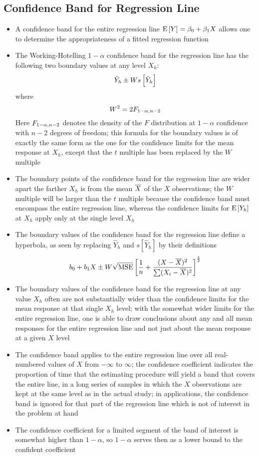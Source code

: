 \subsection{Confidence Band for Regression Line}
\begin{itemize}
\item A confidence band for the entire regression line $\mathrm{E}\left[ Y \right] = \beta_0 + \beta_1X$ allows one to determine the appropriateness of a fitted regression function
\item The Working-Hotelling $1-\alpha$ confidence band for the regression line has the following two boundary values at any level $X_h$: $$ \hat{Y}_h \pm Ws \left[ \hat{Y}_h \right] $$ where $$ W^2 = 2F_{1-\alpha, n-2} $$ Here $F_{1-\alpha, n-2}$ denotes the density of the $F$ distribution at $1-\alpha$ confidence with $n-2$ degrees of freedom; this formula for the boundary values is of exactly the same form as the one for the confidence limits for the mean response at $X_h$, except that the $t$ multiple has been replaced by the $W$ multiple
\item The boundary points of the confidence band for the regression line are wider apart the farther $X_h$ is from the mean $\overline{X}$ of the $X$ observations; the $W$ multiple will be larger than the $t$ multiple because the confidence band must encompass the entire regression line, whereas the confidence limits for $\mathrm{E}\left[ Y_h \right]$ at $X_h$ apply only at the single level $X_h$
\item The boundary values of the confidence band for the regression line define a hyperbola, as seen by replacing $\hat{Y}_h$ and $s[\hat{Y}_h]$ by their definitions $$ b_0 + b_1X \pm W \sqrt{\text{MSE}} \left[ \frac{1}{n} + \frac{(X - \overline{X})^2}{\sum (X_i - \overline{X})^2} \right]^{\frac{1}{2}} $$ 
\item The boundary values of the confidence band for the regression line at any value $X_h$ often are not substantially wider than the confidence limits for the mean response at that single $X_h$ level; with the somewhat wider limits for the entire regression line, one is able to draw conclusions about any and all mean responses for the entire regression line and not just about the mean response at a given $X$ level
\item The confidence band applies to the entire regression line over all real-numbered values of $X$ from $-\infty$ to $\infty$; the confidence coefficient indicates the proportion of time that the estimating procedure will yield a band that covers the entire line, in a long series of samples in which the $X$ observations are kept at the same level as in the actual study; in applications, the confidence band is ignored for that part of the regression line which is not of interest in the problem at hand
\item The confidence coefficient for a limited segment of the band of interest is somewhat higher than $1-\alpha$, so $1-\alpha$ serves then as a lower bound to the confident coefficient
\end{itemize}

